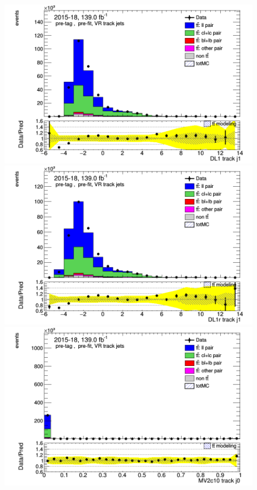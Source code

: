 \documentclass[letterpaper,12pt]{article}
\begin{document}
\begin{figure}[h]
\begin{minipage}[b]{.45\textwidth}
	\centering
	\includegraphics[width=1\textwidth]{Oct_distributions/pretagNoRwDL1rwithhighpTVRJets_scaledall/DataMC__J1_DL1.png}
	\end{minipage}\hfill
	\begin{minipage}[b]{.45\textwidth}
	\centering
	\includegraphics[width=1\textwidth]{Oct_distributions/pretagNoRwDL1rwithhighpTVRJets_scaledall/DataMC__J1_DL1r.png}
	\end{minipage}\hfill
	\begin{minipage}[b]{.45\textwidth}
	\centering
	\includegraphics[width=1\textwidth]{Oct_distributions/pretagNoRwDL1rwithhighpTVRJets_scaledall/DataMC_J0_MV2c10.png}

\end{minipage}
\end{figure}
\end{document}
